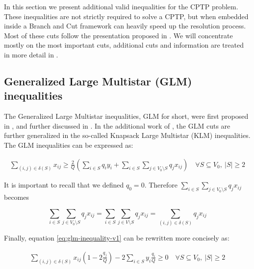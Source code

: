 In this section we present additional valid inequalities for the CPTP problem.
These inequalities are not strictly required to solve a CPTP, but when embedded inside a Branch and Cut framework can heavily speed up the resolution process.
Most of these cuts follow the presentation proposed in \cite{Jepsen2014}.
We will concentrate mostly on the most important cuts, additional cuts and information are treated in more detail in \cite{Jepsen2014}.

\subsection{Generalized Large Multistar (GLM) inequalities}
The Generalized Large Multistar inequalities, GLM for short, were first proposed in \cite{gouveia_result_1995}, and further discussed in \cite{letchford2006projection}.
In the additional work of \cite{letchford_multistars_2002}, the GLM cuts are further generalized in the so-called Knapsack Large Multistar (KLM) inequalities.
The GLM inequalities can be expressed as:

\begin{equation}\label{eq:glm-inequality-v1}
	\begin{split}
		\sum_{(i, j) \in \delta(S)} x_{ij} \ge \frac{2}{Q} \left(  \sum_{i \in S} q_i y_i + \sum_{i \in S} \sum_{j \in V_0 \setminus S} q_j  x_{ij}\right) \quad \forall S \subseteq V_0,\ |S| \ge 2
	\end{split}
\end{equation}

It is important to recall that we defined $q_0 = 0$.
Therefore $\sum_{i \in S} \sum_{j \in V_0 \setminus S} q_j  x_{ij}$ becomes

\begin{equation}
	\sum_{i \in S} \sum_{j \in V_0 \setminus S} q_j  x_{ij} = \sum_{i \in S} \sum_{j \in V \setminus S} q_j  x_{ij} = \sum_{(i, j) \in \delta(S)} q_j x_{ij}
\end{equation}

Finally, equation \eqref{eq:glm-inequality-v1} can be rewritten more concisely as:

\begin{equation}\label{eq:glm-inequality}
	\begin{split}
		\sum_{(i, j) \in \delta(S)} x_{ij} \left( 1 - 2 \frac{q_j}{Q} \right)  -2 \sum_{i \in S} y_i \frac{q_i}{Q}  \ge  0   \quad \forall S \subseteq V_0,\ |S| \ge 2
	\end{split}
\end{equation}


